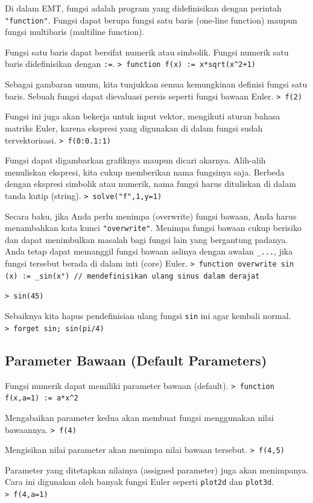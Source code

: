 \documentclass[11pt, a4paper]{article}
\newcommand{\emtcmd}[1]{\noindent\texttt{\textcolor{emtcommand}{>}\ #1}\par\smallskip}
\begin{document}
Di dalam EMT, fungsi adalah program yang didefinisikan dengan perintah \texttt{"function"}. Fungsi dapat berupa fungsi satu baris (one-line function) maupun fungsi multibaris (multiline function).

Fungsi satu baris dapat bersifat numerik atau simbolik. Fungsi numerik satu baris didefinisikan dengan \texttt{:=}.
\emtcmd{function f(x) := x*sqrt(x\^{}2+1)}

Sebagai gambaran umum, kita tunjukkan semua kemungkinan definisi fungsi satu baris. Sebuah fungsi dapat dievaluasi persis seperti fungsi bawaan Euler.
\emtcmd{f(2)}

Fungsi ini juga akan bekerja untuk input vektor, mengikuti aturan bahasa matriks Euler, karena ekspresi yang digunakan di dalam fungsi sudah tervektorisasi.
\emtcmd{f(0:0.1:1)}

Fungsi dapat digambarkan grafiknya maupun dicari akarnya. Alih-alih menuliskan ekspresi, kita cukup memberikan nama fungsinya saja. Berbeda dengan ekspresi simbolik atau numerik, nama fungsi harus dituliskan di dalam tanda kutip (string).
\emtcmd{solve("f",1,y=1)}

Secara baku, jika Anda perlu menimpa (overwrite) fungsi bawaan, Anda harus menambahkan kata kunci \texttt{"overwrite"}. Menimpa fungsi bawaan cukup berisiko dan dapat menimbulkan masalah bagi fungsi lain yang bergantung padanya. Anda tetap dapat memanggil fungsi bawaan aslinya dengan awalan \texttt{\_...}, jika fungsi tersebut berada di dalam inti (core) Euler.
\emtcmd{function overwrite sin (x) := \_sin(x°) \textcolor{emtcomment}{// mendefinisikan ulang sinus dalam derajat}}
\emtcmd{sin(45)}

Sebaiknya kita hapus pendefinisian ulang fungsi \texttt{sin} ini agar kembali normal.
\emtcmd{forget sin; sin(pi/4)}

\subsection*{Parameter Bawaan (Default Parameters)}

Fungsi numerik dapat memiliki parameter bawaan (default).
\emtcmd{function f(x,a=1) := a*x\^{}2}

Mengabaikan parameter kedua akan membuat fungsi menggunakan nilai bawaannya.
\emtcmd{f(4)}

Mengisikan nilai parameter akan menimpa nilai bawaan tersebut.
\emtcmd{f(4,5)}

Parameter yang ditetapkan nilainya (assigned parameter) juga akan menimpanya. Cara ini digunakan oleh banyak fungsi Euler seperti \texttt{plot2d} dan \texttt{plot3d}.
\emtcmd{f(4,a=1)}
\end{document}
